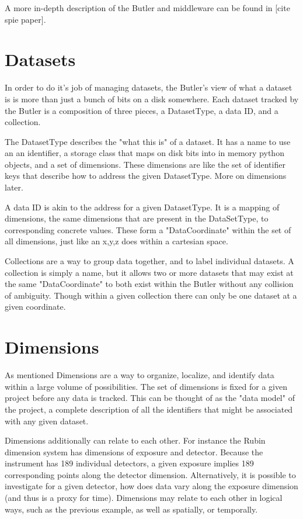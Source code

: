 A more in-depth description of the Butler and middleware can be found in [cite spie paper].

\section{Datasets}
In order to do it's job of managing datasets, the Butler's view of what a dataset is is more than just a bunch of bits on a disk somewhere. Each dataset tracked by the Butler is a composition of three pieces, a DatasetType, a data ID, and a collection.

The DatasetType describes the "what this is" of a dataset. It has a name to use an an identifier, a storage class that maps on disk bits into in memory python objects, and a set of dimensions. These dimensions are like the set of identifier keys that describe how to address the given DatasetType. More on dimensions later.

A data ID is akin to the address for a given DatasetType. It is a mapping of dimensions, the same dimensions that are present in the DataSetType, to corresponding concrete values. These form a "DataCoordinate" within the set of all dimensions, just like an x,y,z does within a cartesian space.

Collections are a way to group data together, and to label individual datasets. A collection is simply a name, but it allows two or more datasets that may exist at the same "DataCoordinate" to both exist within the Butler without any collision of ambiguity. Though within a given collection there can only be one dataset at a given coordinate.

\section{Dimensions}
As mentioned Dimensions are a way to organize, localize, and identify data within a large volume of possibilities. The set of dimensions is fixed for a given project before any data is tracked. This can be thought of as the "data model" of the project, a complete description of all the identifiers that might be associated with any given dataset.

Dimensions additionally can relate to each other. For instance the Rubin dimension system has dimensions of exposure and detector. Because the instrument has 189 individual detectors, a given exposure implies 189 corresponding points along the detector dimension. Alternatively, it is possible to investigate for a given detector, how does data vary along the exposure dimension (and thus is a proxy for time). Dimensions may relate to each other in logical ways, such as the previous example, as well as spatially, or temporally.

